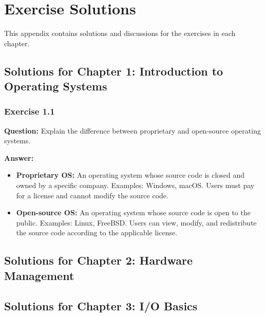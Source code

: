 
\chapter{Exercise Solutions}
\label{app:exercise-solutions}

This appendix contains solutions and discussions for the exercises in each chapter.

\section{Solutions for Chapter 1: Introduction to Operating Systems}

\subsection{Exercise 1.1}
\textbf{Question:} Explain the difference between proprietary and open-source operating systems.

\textbf{Answer:}
\begin{itemize}
    \item \textbf{Proprietary OS:} An operating system whose source code is closed and
          owned by a specific company. Examples: Windows, macOS. Users must
          pay for a license and cannot modify the source code.

    \item \textbf{Open-source OS:} An operating system whose source code is open
          to the public. Examples: Linux, FreeBSD. Users can view, modify,
          and redistribute the source code according to the applicable license.
\end{itemize}


\section{Solutions for Chapter 2: Hardware Management}


\section{Solutions for Chapter 3: I/O Basics}


